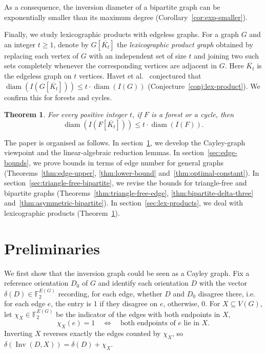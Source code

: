 \documentclass[11pt]{article}
\newtheorem{theorem}{Theorem}[section]
\theoremstyle{remark}
\DeclareMathOperator{\diam}{diam}
\DeclareMathOperator{\Inv}{Inv}
\newcommand{\F}{\mathbb{F}}
\begin{document}
As a consequence, the inversion diameter of a bipartite graph can be exponentially smaller than its maximum degree (Corollary~\ref{cor:exp-smaller}).

Finally, we study lexicographic products with edgeless graphs.
For a graph $G$ and an integer $t\ge1$, denote by $G[\overline{K_t}]$  the {\it lexicographic product graph} obtained by replacing each vertex of $G$ with an independent set of size $t$ and joining two such sets completely whenever the corresponding vertices are adjacent in $G$. Here $\overline{K_t}$ is the edgeless graph on $t$ vertices.
Havet et al.~\cite{HavetHorschRambaud} conjectured that
$\diam(I(G[\overline{K_t}]))\le t\cdot\diam(I(G))$ (Conjecture~\ref{conj:lex-product}).
We confirm this for forests and cycles.

  
\begin{theorem}\label{thm:cycles}
For  every positive integer $t$, if $F$ is a forest or a cycle, then 
     $$
    \diam(I(F[\overline{K_t}]))\le t\cdot \diam(I(F)).
      $$
\end{theorem}


The paper is organised as follows.
In section~\ref{sec:preliminaries}, we develop the Cayley-graph viewpoint and the linear-algebraic reduction lemmas.
In section~\ref{sec:edge-bounds}, we prove bounds in terms of edge number for general graphs (Theorems~\ref{thm:edge-upper}, \ref{thm:lower-bound} and~\ref{thm:optimal-constant}).
In section~\ref{sec:triangle-free-bipartite}, we revise the bounds for triangle-free and bipartite graphs (Theorems~\ref{thm:triangle-free-edge}, \ref{thm:bipartite-delta-three} and~\ref{thm:asymmetric-bipartite}).
In section~\ref{sec:lex-products}, we deal with lexicographic products (Theorem~\ref{thm:cycles}).

\section{Preliminaries}\label{sec:preliminaries}

 

We first show that the inversion graph could be seen as a Cayley graph.  Fix a reference orientation $D_0$ of $G$ and identify each orientation $D$ with the vector
$\delta(D)\in\F_2^{E(G)}$ recording, for each edge, whether $D$ and $D_0$ disagree there, i.e.  for each edge $e$, the entry is 1 if they disagree on $e$, otherwise, 0.
For $X\subseteq V(G)$, let $\chi_X\in\F_2^{E(G)}$ be the indicator of the edges with both endpoints in $X$,
\[
  \chi_X(e)=1 \quad\Longleftrightarrow\quad \text{both endpoints of }e\text{ lie in }X .
\]
Inverting $X$ reverses exactly the edges counted by $\chi_X$, so
$\delta(\Inv(D,X))=\delta(D)+\chi_X$.
\end{document}
